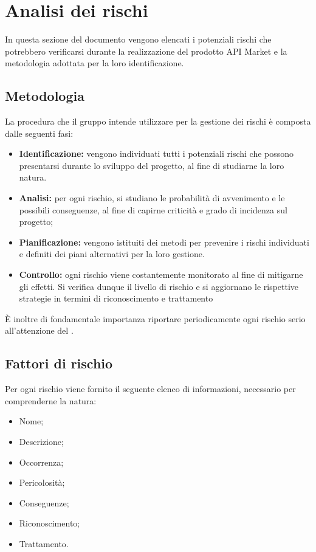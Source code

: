 \newpage
\section{Analisi dei rischi}
In questa sezione del documento vengono elencati i potenziali rischi che potrebbero verificarsi durante la realizzazione del prodotto API Market e la metodologia adottata per la loro identificazione.

\subsection{Metodologia}

La procedura che il gruppo \textit{\gruppo} intende utilizzare per la gestione dei rischi è composta dalle seguenti fasi:
\begin{itemize}
	\item \textbf{Identificazione:} vengono individuati tutti i potenziali rischi che possono presentarsi durante lo sviluppo del progetto, al fine di studiarne la loro natura. 
	\item \textbf{Analisi:} per ogni rischio, si studiano le probabilità di avvenimento e le possibili conseguenze, al fine di capirne criticità e grado di incidenza sul progetto;
	\item \textbf{Pianificazione:} vengono istituiti dei metodi per prevenire i rischi individuati e definiti dei piani alternativi per la loro gestione.
	\item \textbf{Controllo:} ogni rischio viene costantemente monitorato al fine di mitigarne gli effetti. Si verifica dunque il livello di rischio e si aggiornano le rispettive strategie in termini di riconoscimento e trattamento
\end{itemize}

\MakeUppercase{è} inoltre di fondamentale importanza riportare periodicamente ogni rischio serio all'attenzione del \textit{\RdP}.

\subsection{Fattori di rischio}

Per ogni rischio viene fornito il seguente elenco di informazioni, necessario per comprenderne la natura:
\begin{itemize}
	\item Nome;
	\item Descrizione;
	\item Occorrenza;
	\item Pericolosità;
	\item Conseguenze;
	\item Riconoscimento;
	\item Trattamento.
\end{itemize}

